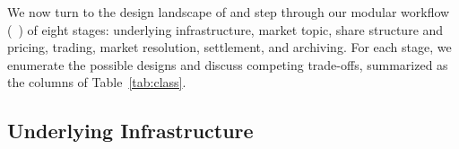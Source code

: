 %
%
%
%
%



We now turn to the design landscape of \depms and step through our modular workflow (\cf~\cite{ClEsGS21}) of eight stages: underlying infrastructure, market topic, share structure and pricing, trading, market resolution, settlement, and archiving. For each stage, we enumerate the possible designs and discuss competing trade-offs, summarized as the columns of Table~\ref{tab:class}. %



\subsection{Underlying Infrastructure}
\label{subsec:blockchain_infra}\label{wf:chain}

